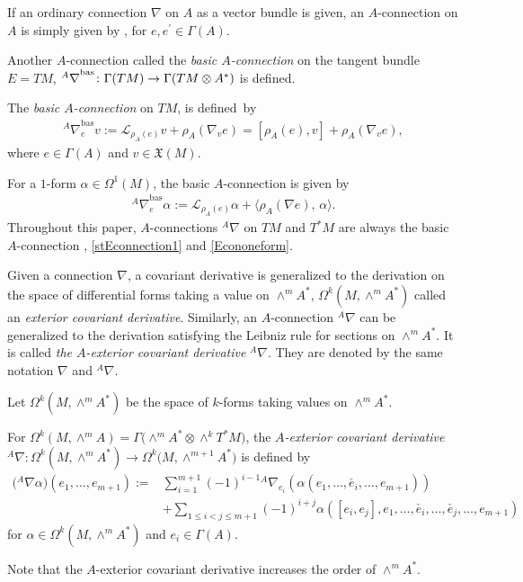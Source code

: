 \documentclass[pdftex]{sigma}
\numberwithin{equation}{section}
\newcommand{\calL}{{\mathcal L}}
\newcommand{\rhoa}{{\rho_A}}
\newcommand{\bracket}[2]{\langle #1,\,#2\rangle}
\newcommand{\nablabas}{{{}^A \nabla}^{\mathrm{bas}}}
\newcommand{\anabla}{{{}^A \nabla}}
\begin{document}
If an ordinary connection $\nabla$ on $A$ as a vector bundle is given,
an $A$-connection on $A$ is simply given by
\smash{$
 \anabla_{e} e^{\prime} := \nabla_{\rhoa(e^{\prime})} {e}$},
for $e, e^{\prime} \in \Gamma(A)$.

Another $A$-connection called the \textit{basic $A$-connection} on
the tangent bundle $E=TM$,
$\smash{\nablabas}\colon\allowbreak \Gamma(TM) \rightarrow \Gamma(TM \otimes A^*)$
is defined.
\begin{Definition}
The \textit{basic $A$-connection} on $TM$,
\smash{$\nablabas\colon \Gamma(TM) \rightarrow \Gamma(TM \otimes A^*)$}
is defined~by
\begin{gather}
\nablabas_{e} v := \calL_{\rhoa(e)} v + \rhoa(\nabla_v e)
= [\rhoa(e), v] + \rhoa(\nabla_v e),
\label{stEconnection1}
\end{gather}
where
$e \in \Gamma(A)$ and $v \in \mathfrak{X}(M)$.
\end{Definition}
For a $1$-form $\alpha \in \Omega^1(M)$, the basic $A$-connection
is given by
\begin{gather}
\nablabas_{e} \alpha := \calL_{\rhoa(e)} \alpha
+ \bracket{\rhoa(\nabla e)}{\alpha}.
\label{Econoneform}
\end{gather}
Throughout this paper, $A$-connections $\anabla$ on $TM$ and $T^*M$ are always
the basic $A$-connection \smash{$\anabla = \nablabas$},
\eqref{stEconnection1} and
\eqref{Econoneform}.

Given a connection $\nabla$, a covariant derivative is generalized
to the derivation on the space of differential forms taking a value on
$\wedge^m A^*$,
$\Omega^k(M, \wedge^m A^*)$ called an \textit{exterior covariant derivative}.
Similarly, an $A$-connection $\anabla$ can be generalized to the derivation
satisfying the Leibniz rule for sections on $\wedge^m A^*$.
It is called \textit{the $A$-exterior covariant derivative} $\anabla$.
They are denoted by the same notation $\nabla$ and ${}^A\nabla$.

Let $\Omega^k(M, \wedge^m A^*) $ be the space of $k$-forms taking values on
$\wedge^m A^*$.
\begin{Definition}
For $\Omega^k(M, \wedge^m A) = \Gamma\bigl(\wedge^m A^* \otimes \wedge^k T^*M\bigr)$,
the \textit{$A$-exterior covariant derivative}
$\anabla\colon \Omega^k(M, \wedge^m A^*) \rightarrow \Omega^k\bigl(M, \wedge^{m+1} A^*\bigr)$ is defined by
\begin{align*}%
\bigl(\anabla \alpha\bigr)(e_1, \ldots, e_{m+1})
:={}& \sum_{i=1}^{m+1} (-1)^{i-1}
\anabla_{e_i}
(\alpha(e_1, \ldots, \check{e_i}, \ldots, e_{m+1}))
\nonumber \\ &
+ \sum_{1 \leq i < j \leq m+1} (-1)^{i+j} \alpha([e_i, e_j], e_1, \ldots, \check{e_i}, \ldots, \check{e_j}, \ldots, e_{m+1})
\end{align*}
for $\alpha \in \Omega^k(M, \wedge^m A^*)$ and $e_i \in \Gamma(A)$.
\end{Definition}
Note that the $A$-exterior covariant derivative increases the order of $\wedge^m A^*$.
\end{document}

